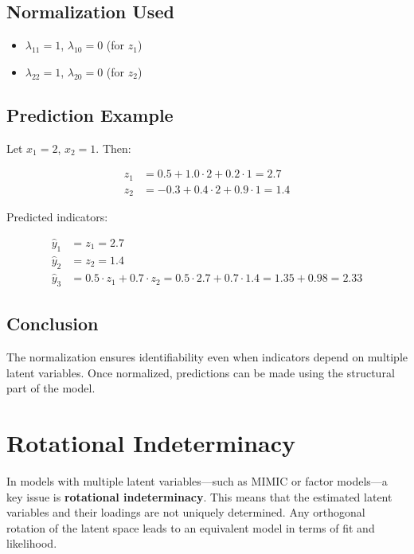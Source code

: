 \documentclass[12pt,a4paper]{article}
\begin{document}
\subsection*{Normalization Used}
\begin{itemize}
    \item $\lambda_{11} = 1$, $\lambda_{10} = 0$ (for $z_1$)
    \item $\lambda_{22} = 1$, $\lambda_{20} = 0$ (for $z_2$)
\end{itemize}

\subsection*{Prediction Example}

Let $x_1 = 2$, $x_2 = 1$. Then:

\[
\begin{aligned}
z_1 &= 0.5 + 1.0 \cdot 2 + 0.2 \cdot 1 = 2.7 \\
z_2 &= -0.3 + 0.4 \cdot 2 + 0.9 \cdot 1 = 1.4
\end{aligned}
\]

Predicted indicators:

\[
\begin{aligned}
\hat{y}_1 &= z_1 = 2.7 \\
\hat{y}_2 &= z_2 = 1.4 \\
\hat{y}_3 &= 0.5 \cdot z_1 + 0.7 \cdot z_2 = 0.5 \cdot 2.7 + 0.7 \cdot 1.4 = 1.35 + 0.98 = 2.33
\end{aligned}
\]

\subsection*{Conclusion}

The normalization ensures identifiability even when indicators depend on multiple latent variables. Once normalized, predictions can be made using the structural part of the model.

\section{Rotational Indeterminacy}

In models with multiple latent variables---such as MIMIC or factor models---a key issue is \textbf{rotational indeterminacy}. This means that the estimated latent variables and their loadings are not uniquely determined. Any orthogonal rotation of the latent space leads to an equivalent model in terms of fit and likelihood.
\end{document}
